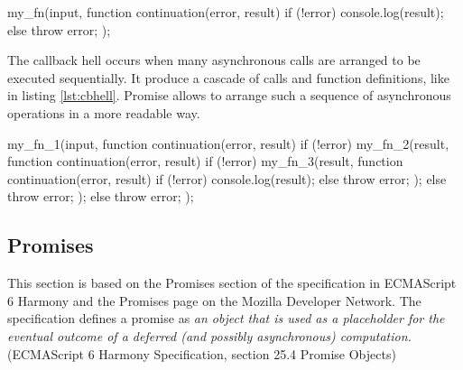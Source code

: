 \begin{code}[js, %
             caption={Example of a continuation}, %
             label={lst:continuation}] %
my_fn(input, function continuation(error, result) {
  if (!error) {
    console.log(result);
  } else {
    throw error;
  }
});
\end{code}

The callback hell occurs when many asynchronous calls are arranged to be executed sequentially.
It produce a cascade of calls and function definitions, like in listing \ref{lst:cbhell}.
Promise allows to arrange such a sequence of asynchronous operations in a more readable way.

\begin{code}[js, %
             caption={Example of a sequence of continuations}, %
             label={lst:cbhell}] %
my_fn_1(input, function continuation(error, result) {
  if (!error) {
    my_fn_2(result, function continuation(error, result) {
      if (!error) {
        my_fn_3(result, function continuation(error, result) {
          if (!error) {
            console.log(result);
          } else {
            throw error;
          }
        });
      } else {
        throw error;
      }
    });
  } else {
    throw error;
  }
});
\end{code}

\subsection{Promises} \label{section:definitions:promise}


This section is based on the Promises section of the specification in ECMAScript 6 Harmony and the Promises page on the Mozilla Developer Network.
The specification defines a promise as \textit{an object that is used as a placeholder for the eventual outcome of a deferred (and possibly asynchronous) computation.} (ECMAScript 6 Harmony Specification, section 25.4 Promise Objects)

